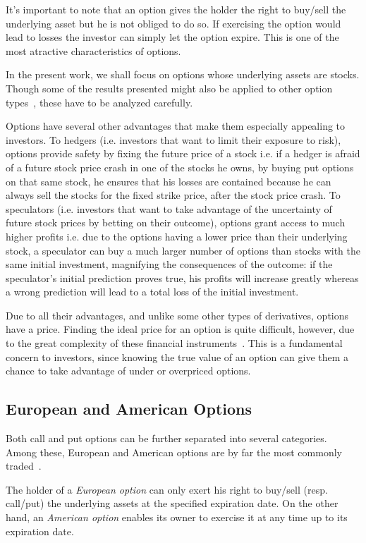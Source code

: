 \documentclass[a4paper,twocolumn,aps,prd,longbibliography,superscriptaddress]{revtex4-1}
\begin{document}
It's important to note that an option gives the holder the right to buy/sell the underlying asset but he is not obliged to do so. If exercising the option would lead to losses the investor can simply let the option expire. This is one of the most atractive characteristics of options.

In the present work, we shall focus on options whose underlying assets are stocks. Though some of the results presented might also be applied to other option types~\cite{Hull}, these have to be analyzed carefully.


Options have several other advantages that make them especially appealing to investors.
To hedgers (i.e. investors that want to limit their exposure to risk), options provide safety by fixing the future price of a stock i.e. if a hedger is afraid of a future stock price crash in one of the stocks he owns, by buying put options on that same stock, he ensures that his losses are contained because he can always sell the stocks for the fixed strike price, after the stock price crash.
To speculators (i.e. investors that want to take advantage of the uncertainty of future stock prices by betting on their outcome), options grant access to much higher profits i.e. due to the options having a lower price than their underlying stock, a speculator can buy a much larger number of options than stocks with the same initial investment, magnifying the consequences of the outcome: if the speculator's initial prediction proves true, his profits will increase greatly whereas a wrong prediction will lead to a total loss of the initial investment.

Due to all their advantages, and unlike some other types of derivatives, options have a price. Finding the ideal price for an option is quite difficult, however, due to the great complexity of these financial instruments~\cite{Hull}. This is a fundamental concern to investors, since knowing the true value of an option can give them a chance to take advantage of under or overpriced options.




\subsection{European and American Options}
Both call and put options can be further separated into several categories. Among these, European and American options are by far the most commonly traded~\cite{Hull}.

The holder of a \textit{European option} can only exert his right to buy/sell (resp. call/put) the underlying assets at the specified expiration date.
On the other hand, an \textit{American option} enables its owner to exercise it at any time up to its expiration date.
\end{document}
